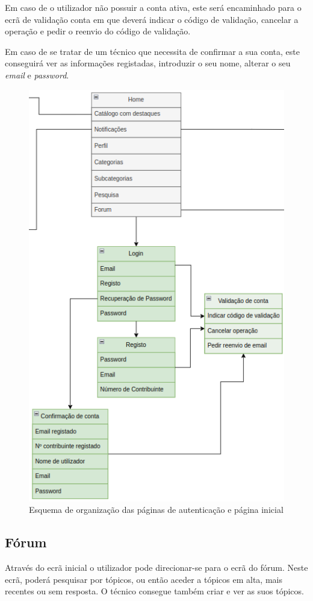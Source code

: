 Em caso de o utilizador não possuir a conta ativa, este será encaminhado para o ecrã de validação conta em que deverá indicar o código de validação, cancelar a operação e pedir o reenvio do código de validação.

Em caso de se tratar de um técnico que necessita de confirmar a sua conta, este conseguirá ver as informações registadas, introduzir o seu nome, alterar o seu \textit{email} e \textit{password}.

\begin{figure}[htb]
  \centering
  \includegraphics[height=0.9\textwidth]{images/Arquiteturas/superficial_de_app/home_auth.png}
  \caption{Esquema de organização das páginas de autenticação e página inicial}
  \label{fig:4}
\end{figure}

\newpage

\subsection{Fórum}

Através do ecrã inicial o utilizador pode direcionar-se para o ecrã do fórum. Neste ecrã, poderá pesquisar por tópicos, ou então aceder a tópicos em alta, mais recentes ou sem resposta.
O técnico consegue também criar e ver as suos tópicos.

